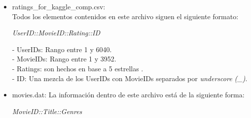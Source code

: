 \documentclass{sciposter}
\begin{document}
\begin{multicols}{3}
\begin{itemize}
La ocupaci\'on es elegida de acuerdo a los siguientes elementos:
\begin{center}
	*  0:  "other" or not specified\\
	*  1:  "academic/educator"\\
	*  2:  "artist"\\
	*  3:  "clerical/admin"\\
	*  4:  "college/grad student"\\
	*  5:  "customer service"\\
	*  6:  "doctor/health care"\\
	*  7:  "executive/managerial"\\
	*  8:  "farmer"\\
	*  9:  "homemaker"\\
	* 10:  "K-12 student"\\
	* 11:  "lawyer"\\
	* 12:  "programmer"\\
	* 13:  "retired"\\
	* 14:  "sales/marketing"\\
	* 15:  "scientist"\\
	* 16:  "self-employed"\\
	* 17:  "technician/engineer"\\
	* 18:  "tradesman/craftsman"\\
	* 19:  "unemployed"\\
	* 20:  "writer"\\
\end{center}
\item ratings\_for\_kaggle\_comp.csv: \\
Todos los elementos contenidos en este archivo siguen el siguiente formato:\\
\begin{center}
\emph{UserID::MovieID::Rating::ID}
\end{center}
- UserIDs: Rango entre 1 y 6040.\\
- MovieIDs: Rango entre 1 y 3952.\\
- Ratings: son hechos en base a 5 estrellas .\\
- ID: Una mezcla de los UserIDs con MovieIDs separados por \emph{underscore (\_)}.\\
\item movies.dat: La informaci\'on dentro de este archivo est\'a de la siguiente forma:\\
\begin{center}
\emph{MovieID::Title::Genres}
\end{center}

\end{itemize}
\end{multicols}
\end{document}
